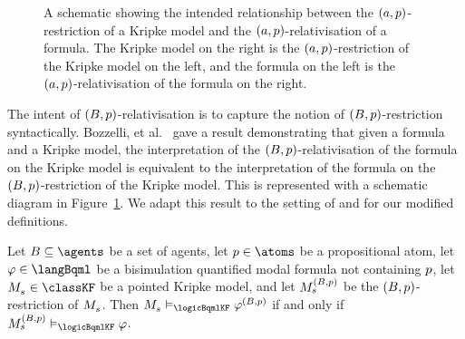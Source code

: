 \begin{figure}
    \centering
    \caption{A schematic showing the intended relationship between the $(a, p)$-restriction of a Kripke model and the $(a, p)$-relativisation of a formula. The Kripke model on the right is the $(a, p)$-restriction of the Kripke model on the left, and the formula on the left is the $(a, p)$-relativisation of the formula on the right.}\label{rml-k4-relativisation-restriction-diagram}
\end{figure}

The intent of $(B, p)$-relativisation is to capture the notion of $(B, p)$-restriction syntactically.
Bozzelli, et al.~\cite{bozzelli:2014b} gave a result demonstrating that given a \langBqml{} formula and a Kripke model, the interpretation of the $(B, p)$-relativisation of the formula on the Kripke model is equivalent to the interpretation of the formula on the $(B, p)$-restriction of the Kripke model.
This is represented with a schematic diagram in Figure~\ref{rml-k4-relativisation-restriction-diagram}.
We adapt this result to the setting of \classKF{} and for our modified definitions.

\begin{lemma}\label{rml-k4-relativisation-restriction}
Let $\agentsB \subseteq \agents$ be a set of agents, let $\atomP \in \atoms$ be a propositional atom, let $\phi \in \langBqml$ be a bisimulation quantified modal formula not containing $p$, let $\kPModel{\kStateS} \in \classKF$ be a pointed Kripke model, and let $\kPModel[(\agentsB, \atomP)]{\kStateS}$ be the $(B, p)$-restriction of $\kPModel{\kStateS}$.
Then $\kPModel{\kStateS} \entails_\logicBqmlKF \phi^{(\agentsB, \atomP)}$ if and only if $\kPModel[(\agentsB, \atomP)]{\kStateS} \entails_\logicBqmlKF \phi$.
\end{lemma}

